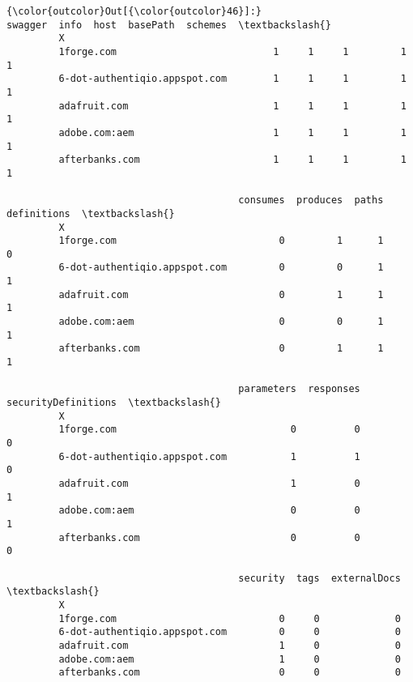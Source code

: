 \documentclass[11pt]{article}
\begin{document}
\begin{Verbatim}[commandchars=\\\{\}]
{\color{outcolor}Out[{\color{outcolor}46}]:}                                swagger  info  host  basePath  schemes  \textbackslash{}
         X                                                                       
         1forge.com                           1     1     1         1        1   
         6-dot-authentiqio.appspot.com        1     1     1         1        1   
         adafruit.com                         1     1     1         1        1   
         adobe.com:aem                        1     1     1         1        1   
         afterbanks.com                       1     1     1         1        1   
         
                                        consumes  produces  paths  definitions  \textbackslash{}
         X                                                                       
         1forge.com                            0         1      1            0   
         6-dot-authentiqio.appspot.com         0         0      1            1   
         adafruit.com                          0         1      1            1   
         adobe.com:aem                         0         0      1            1   
         afterbanks.com                        0         1      1            1   
         
                                        parameters  responses  securityDefinitions  \textbackslash{}
         X                                                                           
         1forge.com                              0          0                    0   
         6-dot-authentiqio.appspot.com           1          1                    0   
         adafruit.com                            1          0                    1   
         adobe.com:aem                           0          0                    1   
         afterbanks.com                          0          0                    0   
         
                                        security  tags  externalDocs  \textbackslash{}
         X                                                             
         1forge.com                            0     0             0   
         6-dot-authentiqio.appspot.com         0     0             0   
         adafruit.com                          1     0             0   
         adobe.com:aem                         1     0             0   
         afterbanks.com                        0     0             0   
         

\end{Verbatim}
\end{document}
